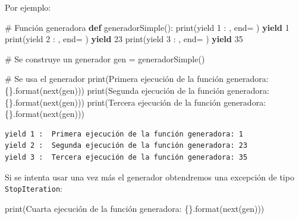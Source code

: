 \documentclass[
  spanish,
  letterpaper,
]{scrbook}
\newenvironment{Shaded}{\begin{snugshade}}{\end{snugshade}}
\newcommand{\BuiltInTok}[1]{\textcolor[rgb]{0.00,0.23,0.31}{#1}}
\newcommand{\CommentTok}[1]{\textcolor[rgb]{0.37,0.37,0.37}{#1}}
\newcommand{\ControlFlowTok}[1]{\textcolor[rgb]{0.00,0.23,0.31}{\textbf{#1}}}
\newcommand{\DecValTok}[1]{\textcolor[rgb]{0.68,0.00,0.00}{#1}}
\newcommand{\KeywordTok}[1]{\textcolor[rgb]{0.00,0.23,0.31}{\textbf{#1}}}
\newcommand{\NormalTok}[1]{\textcolor[rgb]{0.00,0.23,0.31}{#1}}
\newcommand{\OperatorTok}[1]{\textcolor[rgb]{0.37,0.37,0.37}{#1}}
\newcommand{\SpecialCharTok}[1]{\textcolor[rgb]{0.37,0.37,0.37}{#1}}
\newcommand{\StringTok}[1]{\textcolor[rgb]{0.13,0.47,0.30}{#1}}
\theoremstyle{definition}
\theoremstyle{remark}
\begin{document}
Por ejemplo:

\begin{Shaded}
\begin{Highlighting}[]
\CommentTok{\# Función generadora}
\KeywordTok{def}\NormalTok{ generadorSimple():}
    \BuiltInTok{print}\NormalTok{(}\StringTok{\textquotesingle{}yield 1 : \textquotesingle{}}\NormalTok{, end}\OperatorTok{=}\StringTok{\textquotesingle{} \textquotesingle{}}\NormalTok{)}
    \ControlFlowTok{yield} \DecValTok{1}
    \BuiltInTok{print}\NormalTok{(}\StringTok{\textquotesingle{}yield 2 : \textquotesingle{}}\NormalTok{, end}\OperatorTok{=}\StringTok{\textquotesingle{} \textquotesingle{}}\NormalTok{)}
    \ControlFlowTok{yield} \DecValTok{23}
    \BuiltInTok{print}\NormalTok{(}\StringTok{\textquotesingle{}yield 3 : \textquotesingle{}}\NormalTok{, end}\OperatorTok{=}\StringTok{\textquotesingle{} \textquotesingle{}}\NormalTok{)}
    \ControlFlowTok{yield} \DecValTok{35}

\CommentTok{\# Se construye un generador}
\NormalTok{gen }\OperatorTok{=}\NormalTok{ generadorSimple()}

\CommentTok{\# Se usa el generador}
\BuiltInTok{print}\NormalTok{(}\StringTok{\textquotesingle{}Primera ejecución de la función generadora: }\SpecialCharTok{\{\}}\StringTok{\textquotesingle{}}\NormalTok{.}\BuiltInTok{format}\NormalTok{(}\BuiltInTok{next}\NormalTok{(gen)))}
\BuiltInTok{print}\NormalTok{(}\StringTok{\textquotesingle{}Segunda ejecución de la función generadora: }\SpecialCharTok{\{\}}\StringTok{\textquotesingle{}}\NormalTok{.}\BuiltInTok{format}\NormalTok{(}\BuiltInTok{next}\NormalTok{(gen)))}
\BuiltInTok{print}\NormalTok{(}\StringTok{\textquotesingle{}Tercera ejecución de la función generadora: }\SpecialCharTok{\{\}}\StringTok{\textquotesingle{}}\NormalTok{.}\BuiltInTok{format}\NormalTok{(}\BuiltInTok{next}\NormalTok{(gen)))}
\end{Highlighting}
\end{Shaded}

\begin{verbatim}
yield 1 :  Primera ejecución de la función generadora: 1
yield 2 :  Segunda ejecución de la función generadora: 23
yield 3 :  Tercera ejecución de la función generadora: 35
\end{verbatim}

Si se intenta usar una vez más el generador obtendremos una excepción de
tipo \texttt{StopIteration}:

\begin{Shaded}
\begin{Highlighting}[]
\BuiltInTok{print}\NormalTok{(}\StringTok{\textquotesingle{}Cuarta ejecución de la función generadora: }\SpecialCharTok{\{\}}\StringTok{\textquotesingle{}}\NormalTok{.}\BuiltInTok{format}\NormalTok{(}\BuiltInTok{next}\NormalTok{(gen)))}
\end{Highlighting}
\end{Shaded}
\end{document}
